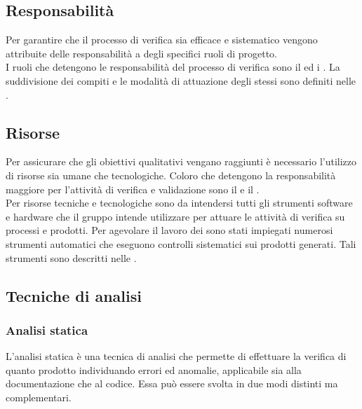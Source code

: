 \subsection{Responsabilità}
Per garantire che il processo di verifica sia efficace e sistematico vengono attribuite delle responsabilità a degli specifici ruoli di progetto.\\
I ruoli che detengono le responsabilità del processo di verifica sono il \textit{\RdP} ed i \textit{\Vers}. La suddivisione dei compiti e le modalità di attuazione degli stessi sono definiti nelle \textit{\NdP}.

\subsection{Risorse}
Per assicurare che gli obiettivi qualitativi vengano raggiunti è necessario l'utilizzo di risorse sia umane che tecnologiche. Coloro che detengono la responsabilità maggiore per l'attività di verifica e validazione sono il \textit{\RdP} e il \textit{\Ver}.\\
Per risorse tecniche e tecnologiche sono da intendersi tutti gli strumenti software e hardware che il gruppo intende utilizzare per attuare le attività di verifica su processi e prodotti. Per agevolare il lavoro dei \textit{\Vers} sono stati impiegati numerosi strumenti automatici che eseguono controlli sistematici sui prodotti generati. Tali strumenti sono descritti nelle \textit{\NdP}.

\subsection{Tecniche di analisi}
\subsubsection{Analisi statica}
L'analisi statica è una tecnica di analisi che permette di effettuare la verifica di quanto prodotto individuando errori ed anomalie, applicabile sia alla documentazione che al codice. Essa può essere svolta in due modi distinti ma complementari.


